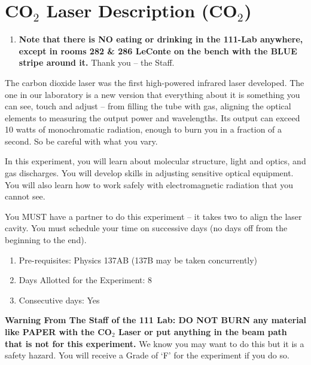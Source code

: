 \documentclass{../lab}
\begin{document}
\maketitle

\tableofcontents

\section{CO\texorpdfstring{$_2$}{2} Laser Description (CO\texorpdfstring{$_2$}{2})}

\begin{enumerate}
    \item \textbf{Note that there is NO eating or drinking in the 111-Lab anywhere, except in rooms 282 \& 286 LeConte on the bench with the BLUE stripe around it.} Thank you -- the Staff.

\end{enumerate}

The carbon dioxide laser was the first high-powered infrared laser developed. The one in our laboratory is a new version that everything about it is something you can see, touch and adjust -- from filling the tube with gas, aligning the optical elements to measuring the output power and wavelengths. Its output can exceed 10 watts of monochromatic radiation, enough to burn you in a fraction of a second. So be careful with what you vary. 

In this experiment, you will learn about molecular structure, light and optics, and gas discharges. You will develop skills in adjusting sensitive optical equipment. You will also learn how to work safely with electromagnetic radiation that you cannot see.

You MUST have a partner to do this experiment -- it takes two to align the laser cavity. You must schedule your time on successive days (no days off from the beginning to the end).

\begin{enumerate}
    \item Pre-requisites: Physics 137AB (137B may be taken concurrently)

    \item Days Allotted for the Experiment: 8

    \item Consecutive days: Yes

\end{enumerate}

\textbf{Warning From The Staff of the 111 Lab: DO NOT BURN any material like PAPER with the CO$_2$ Laser or put anything in the beam path that is not for this experiment.} We know you may want to do this but it is a safety hazard. You will receive a Grade of `F' for the experiment if you do so.
\end{document}
